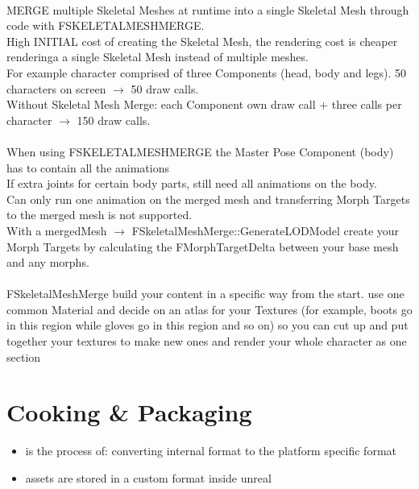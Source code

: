 \documentclass{scrbook}
\begin{document}
\smallskip\\
                MERGE multiple Skeletal Meshes at runtime into a single Skeletal Mesh through code with FSKELETALMESHMERGE. \\
                High INITIAL cost of creating the Skeletal Mesh, the rendering cost is cheaper renderinga a single Skeletal Mesh instead of multiple meshes. \\
                For example character comprised of three Components (head, body and legs).  50 characters on screen $\rightarrow$ 50 draw calls. \\
                Without Skeletal Mesh Merge: each Component own draw call + three calls per character $\rightarrow$ 150 draw calls.  \\
\smallskip \\
                When using FSKELETALMESHMERGE the Master Pose Component (body) has to contain all the animations \\
                If extra joints for certain body parts, still need all animations on the body. \\
                Can only run one animation on the merged mesh and transferring Morph Targets to the merged mesh is not supported. \\
                With a mergedMesh $\rightarrow$ FSkeletalMeshMerge::GenerateLODModel create your Morph Targets by calculating the FMorphTargetDelta between your base mesh and any morphs. \\
\smallskip \\
                FSkeletalMeshMerge build your content in a specific way from the start.
                use one common Material and decide on an atlas for your Textures (for example, boots go in this region while gloves go in this region and so on)
                so you can cut up and put together your textures to make new ones and render your whole character as one section \\

\smallskip






            

    \chapter{Cooking \& Packaging}
        \begin{itemize}
            \item is the process of: converting internal format to the platform specific format
            \item assets are stored in a custom format inside unreal
        \end{itemize}
\end{document}
